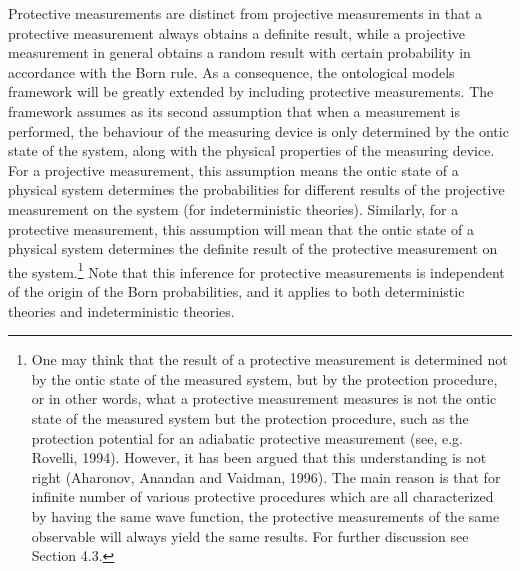 Protective measurements are distinct from projective measurements in that a protective measurement always obtains a definite result, while a projective measurement in general obtains a random result with certain probability in accordance with the Born rule. 
As a consequence, the ontological models framework will be greatly extended by including protective measurements. The framework assumes as its second assumption that when a measurement is performed, the behaviour of the measuring device is only determined by the ontic state of the system, along with the physical properties of the measuring device. 
For a projective measurement,  this assumption means the ontic state of a physical system determines the probabilities for different results of the projective measurement on the system (for indeterministic theories). Similarly, for a protective measurement, this assumption will mean that the ontic state  of a physical system determines the definite result of the protective measurement on the system.\footnote{One may think that the result of a protective measurement is determined not by the ontic state of the measured system, but by the protection procedure, or in other words, what a protective measurement measures is not the ontic state of the measured system but the protection procedure, such as the protection potential for an adiabatic protective measurement (see, e.g. Rovelli, 1994). However, it has been argued that this understanding is not right (Aharonov, Anandan and Vaidman, 1996). The main reason is that for infinite number of various protective procedures which are all characterized by having the same wave function, the protective measurements of the same observable will always yield the same results. For further discussion see Section 4.3.} 
Note that this inference for protective measurements is independent of the origin of the Born probabilities, and it applies to both deterministic theories and indeterministic theories.

